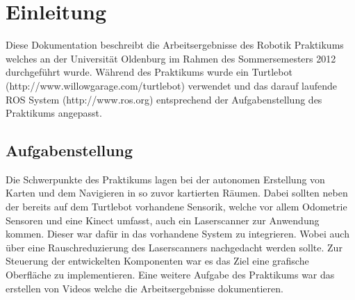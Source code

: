 \chapter{Einleitung}

Diese Dokumentation beschreibt die Arbeitsergebnisse des Robotik Praktikums welches an der Universität Oldenburg im Rahmen des Sommersemesters 2012 durchgeführt wurde. Während des Praktikums wurde ein Turtlebot (http://www.willowgarage.com/turtlebot) verwendet und das darauf laufende ROS System (http://www.ros.org) entsprechend der Aufgabenstellung des Praktikums angepasst.

\section{Aufgabenstellung}

Die Schwerpunkte des Praktikums lagen bei der autonomen Erstellung von Karten und dem Navigieren in so zuvor kartierten Räumen. Dabei sollten neben der bereits auf dem Turtlebot vorhandene Sensorik, welche vor allem Odometrie Sensoren und eine Kinect umfasst, auch ein Laserscanner zur Anwendung kommen. Dieser war dafür in das vorhandene System zu integrieren. Wobei auch über eine Rauschreduzierung des Laserscanners nachgedacht werden sollte. Zur Steuerung der entwickelten Komponenten war es das Ziel eine grafische Oberfläche zu implementieren. Eine weitere Aufgabe des Praktikums war das erstellen von Videos welche die Arbeitsergebnisse dokumentieren.